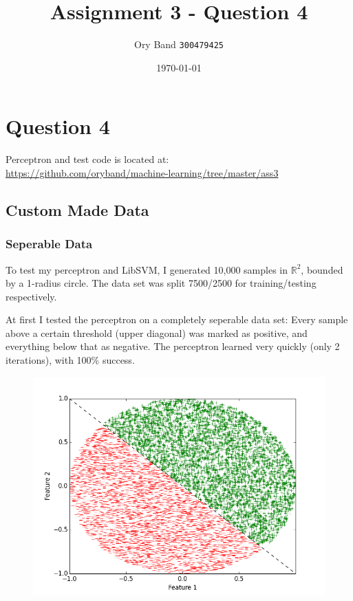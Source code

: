 \documentclass[a4paper]{article}
\title{Assignment 3 - Question 4}
\author{Ory Band \texttt{300479425}}
\date{\today}
\begin{document}
\maketitle
\newpage

\section {Question 4}

Perceptron and test code is located at:
\\
\url{https://github.com/oryband/machine-learning/tree/master/ass3}

\subsection {Custom Made Data}

\subsubsection {Seperable Data}

To test my perceptron and LibSVM,
I generated 10,000 samples in $\mathbb{R}^2$, bounded by a 1-radius circle.
The data set was split 7500/2500 for training/testing respectively.

At first I tested the perceptron on a completely seperable data set:
Every sample above a certain threshold (upper diagonal) was marked as positive,
and everything below that as negative.
The perceptron learned very quickly (only 2 iterations), with 100\% success.

\begin{figure}[h!]
    \includegraphics[width=1.0\textwidth]{images/seperable.png}
\end{figure}
\end{document}

